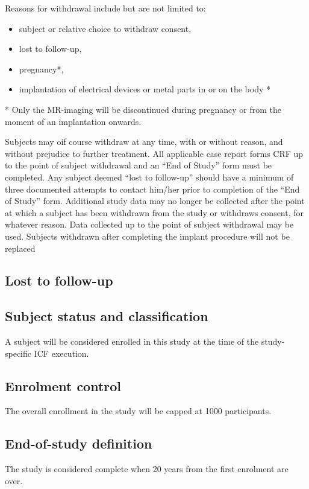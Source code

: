 \documentclass[
	a4paper, 
	11.5pt,
	headings=small, 
	twoside, 
	titlepage=firstiscover, 
 	pagesize=auto,
  	version=last,
	open=any,
	BCOR=14mm,
  	chapterprefix=false]{scrbook}
\begin{document}
Reasons for withdrawal include but are not limited to:
\begin{itemize}
\item subject or relative choice to withdraw consent,
\item lost to follow-up,
\item pregnancy*,
\item implantation of electrical devices or metal parts in or on the body *
\end{itemize}

* Only the MR-imaging will be discontinued during pregnancy or from the moment of an implantation onwards.

Subjects may oif course withdraw at any time, with or without reason, and without prejudice to further treatment. All applicable case report forms \ac{CRF} up to the point of subject withdrawal and an ``End of Study'' form must be completed. Any subject deemed ``lost to follow-up'' should have a minimum of three documented attempts to contact him/her prior to completion of the ``End of Study'' form. Additional study data may no longer be collected after the point at which a subject has been withdrawn from the study or withdraws consent, for whatever reason. Data collected up to the point of subject withdrawal may be used. Subjects withdrawn after completing the implant procedure will not be replaced 

\subsection{Lost to follow-up}
\subsection{Subject status and classification}
A subject will be considered enrolled in this study at the time of the study-specific \ac{ICF} execution.

\subsection{Enrolment control}
The overall enrollment in the study will be capped at 1000 participants.

\subsection{End-of-study definition}
The study is considered complete when 20 years from the first enrolment are over.
\end{document}
